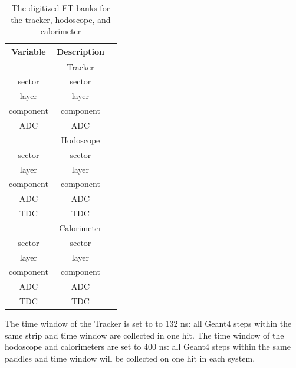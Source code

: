 \begin{table}[h]
	\begin{center}
		\begin{tabular}{| c | c | c |}
			\hline \hline
			Variable            & Description      \\
			\hline
		                         & Tracker         \\
			\hline
                         sector  &     sector      \\
                          layer  &      layer      \\
                      component  &  component      \\
                            ADC  &        ADC      \\
			\hline
		                         & Hodoscope       \\
			\hline
						 sector  &     sector      \\
                          layer  &      layer      \\
                      component  &  component      \\
                            ADC  &        ADC      \\
                            TDC  &        TDC      \\
			\hline
								 & Calorimeter     \\
			\hline
				         sector  &     sector      \\
				   	      layer  &      layer      \\
					  component  &  component      \\
							ADC  &        ADC      \\
							TDC  &        TDC      \\
			\hline \hline
		\end{tabular}
	\end{center}
	\caption{The digitized FT banks for the tracker, hodoscope, and calorimeter}\label{tab:ftBank}
\end{table}

\noindent The time window  of the Tracker is set to to 132 ns: all Geant4 steps within the same strip and time window are collected in one hit.
The time window of the hodoscope and calorimeters are set to 400 ns: all Geant4 steps within the same paddles and time window
will be collected on one hit in each system.
